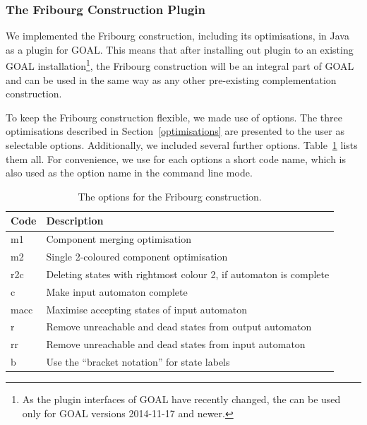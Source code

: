 \subsubsection{The Fribourg Construction Plugin}



We implemented the Fribourg construction, including its optimisations, in Java as a plugin for GOAL. This means that after installing out plugin to an existing GOAL installation\footnote{As the plugin interfaces of GOAL have recently changed, the can be used only for GOAL versions 2014-11-17 and newer.}, the Fribourg construction will be an integral part of GOAL and can be used in the same way as any other pre-existing complementation construction.

To keep the Fribourg construction flexible, we made use of options. The three optimisations described in Section~\ref{optimisations} are presented to the user as selectable options. Additionally, we included several further options. Table~\ref{goal_fribourg_options} lists them all. For convenience, we use for each options a short code name, which is also used as the option name in the command line mode.

\begin{table}
\caption{The options for the Fribourg construction.}
\begin{center}
\begin{tabular}{|l|l|}
\hline
Code & Description \\ \hline
m1 & Component merging optimisation \\ \hline
m2 & Single 2-coloured component optimisation \\ \hline
r2c & Deleting states with rightmost colour 2, if automaton is complete \\ \hline
c & Make input automaton complete \\ \hline
macc & Maximise accepting states of input automaton \\ \hline
r & Remove unreachable and dead states from output automaton \\ \hline
rr & Remove unreachable and dead states from input automaton \\ \hline
b & Use the ``bracket notation'' for state labels \\ \hline
\end{tabular}
\end{center}
\label{goal_fribourg_options}
\end{table}

